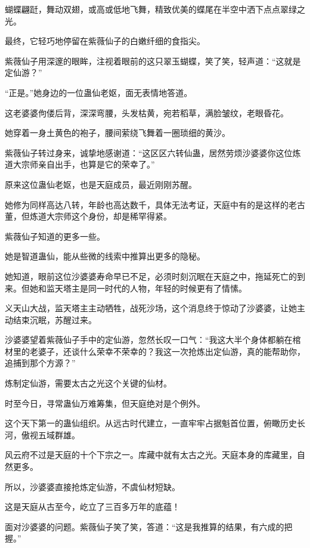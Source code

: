 
\begin{this_body}



蝴蝶翩跹，舞动双翅，或高或低地飞舞，精致优美的蝶尾在半空中洒下点点翠绿之光。

最终，它轻巧地停留在紫薇仙子的白嫩纤细的食指尖。

紫薇仙子用深邃的眼眸，注视着眼前的这只翠玉蝴蝶，笑了笑，轻声道：“这就是定仙游？”

“正是。”她身边的一位蛊仙老妪，面无表情地答道。

这老婆婆佝偻后背，深深弯腰，头发枯黄，宛若稻草，满脸皱纹，老眼昏花。

她穿着一身土黄色的袍子，腰间萦绕飞舞着一圈琐细的黄沙。

紫薇仙子转过身来，诚挚地感谢道：“这区区六转仙蛊，居然劳烦沙婆婆你这位炼道大宗师亲自出手，也算是它的荣幸了。”

原来这位蛊仙老妪，也是天庭成员，最近刚刚苏醒。

她修为同样高达八转，年龄也高达数千，具体无法考证，天庭中有的是这样的老古董，但炼道大宗师这个身份，却是稀罕得紧。

紫薇仙子知道的更多一些。

她是智道蛊仙，能从些微的线索中推算出更多的隐秘。

她知道，眼前这位沙婆婆寿命早已不足，必须时刻沉眠在天庭之中，拖延死亡的到来。但她和监天塔主是同一时代的人物，年轻的时候更有了情愫。

义天山大战，监天塔主主动牺牲，战死沙场，这个消息终于惊动了沙婆婆，让她主动结束沉眠，苏醒过来。

沙婆婆望着紫薇仙子手中的定仙游，忽然长叹一口气：“我这大半个身体都躺在棺材里的老婆子，还谈什么荣幸不荣幸的？我这一次抢炼出定仙游，真的能帮助你，追捕到那个方源？”

炼制定仙游，需要太古之光这个关键的仙材。

时至今日，寻常蛊仙万难筹集，但天庭绝对是个例外。

这个天下第一的蛊仙组织。从远古时代建立，一直牢牢占据魁首位置，俯瞰历史长河，傲视五域群雄。

风云府不过是天庭的十个下宗之一。库藏中就有太古之光。天庭本身的库藏里，自然更多。

所以，沙婆婆直接抢炼定仙游，不虞仙材短缺。

这是天庭从古至今，屹立了三百多万年的底蕴！

面对沙婆婆的问题。紫薇仙子笑了笑，答道：“这是我推算的结果，有六成的把握。”


\end{this_body}
